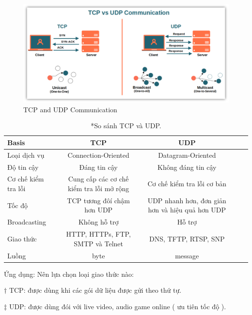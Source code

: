 \documentclass[APA,STIX1COL]{WileyNJD-v2}
\begin{document}
\begin{figure}[h]
  \centering
  \includegraphics[scale=0.3]{tcp_udp}
  \caption{TCP and UDP Communication}
  \label{fig:tcpvsudp}
\end{figure}



\begin{center}
  \begin{table}[t]%
  \centering
  \caption{*So sánh TCP và UDP.\label{tab2}}%
  \begin{tabular*}{500pt}{@{\extracolsep\fill}lcccc@{\extracolsep\fill}}
  \toprule
  \textbf{Basis} & \textbf{TCP}  & \textbf{UDP} \\
  \midrule
  Loại dịch vụ & Connection-Oriented  & Datagram-Oriented     \\
  Độ tin cậy & Đáng tin cậy  & Không đáng tin cậy  \\
  Cơ chế kiểm tra lỗi & Cung cấp các cơ chế kiểm tra lỗi mở rộng  & Cơ chế kiểm tra lỗi cơ bản  \\
  Tốc độ & TCP tương đôí chậm hơn UDP & UDP nhanh hơn, đơn giản hơn và hiệu quả hơn UDP \\
  Broadcasting & Không hỗ trợ & Hỗ trợ \\
  Giao thức & HTTP, HTTPs, FTP, SMTP và Telnet & DNS, TFTP, RTSP, SNP \\
  Luồng & byte & message \\


  \bottomrule
  \end{tabular*}
  \begin{tablenotes}
  \item Ứng dụng: Nên lựa chọn loại giao thức nào:
  \item[$\dagger$] TCP: được dùng khi các gói dữ liệu được gửi theo thứ tự.
  \item[$\ddagger$] UDP: được dùng đói với live video, audio game online ( ưu tiên tốc độ ).
  \end{tablenotes}
  \end{table}
  \end{center}
\end{document}
